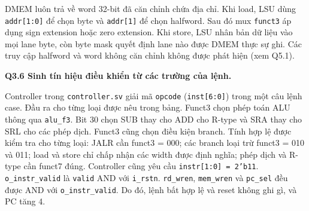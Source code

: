 \documentclass[10pt,a4paper]{article}
\newcommand{\code}[1]{\texttt{#1}}
\begin{document}
DMEM luôn trả về word 32-bit đã căn chỉnh chứa địa chỉ. Khi load, LSU dùng
\code{addr[1:0]} để chọn byte và \code{addr[1]} để chọn halfword. Sau đó mux
\code{funct3} áp dụng sign extension hoặc zero extension. Khi store, LSU nhân
bản dữ liệu vào mọi lane byte, còn byte mask quyết định lane nào được DMEM
thực sự ghi. Các truy cập halfword và word không căn chỉnh không được phát
hiện (xem Q5.1).

\textbf{Q3.6 Sinh tín hiệu điều khiển từ các
trường của lệnh.}

\begin{center}
\end{center}

Controller trong \code{controller.sv} giải mã \code{opcode} (\code{inst[6:0]})
trong một câu lệnh case. Đầu ra cho từng loại được nêu trong bảng. Funct3
chọn phép toán ALU thông qua \code{alu\_f3}. Bit 30 chọn SUB thay cho ADD
cho R-type và SRA thay cho SRL cho các phép dịch. Funct3 cũng chọn điều kiện branch.
Tính hợp lệ được kiểm tra cho từng loại: JALR cần funct3 = 000; các branch
loại trừ funct3 = 010 và 011; load và store chỉ chấp nhận các width được định nghĩa;
phép dịch và R-type cần funct7 đúng. Controller cũng yêu cầu
\code{instr[1:0] = 2'b11}. \code{o\_instr\_valid} là \code{valid} AND với
\code{i\_rstn}. \code{rd\_wren}, \code{mem\_wren} và \code{pc\_sel} đều được
AND với \code{o\_instr\_valid}. Do đó, lệnh bất hợp lệ và reset
không ghi gì, và PC tăng 4.
\end{document}

